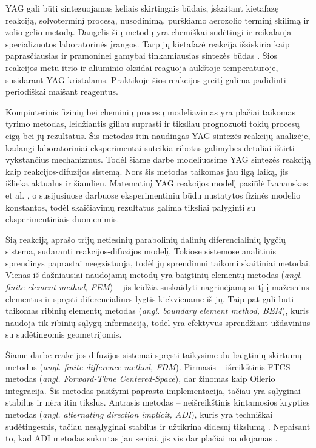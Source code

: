 \documentclass[]{VUMIFTemplateClass}
\begin{document}
YAG gali būti sintezuojamas keliais skirtingais būdais, įskaitant kietafazę reakciją, solvoterminį procesą, nusodinimą, purškiamo aerozolio terminį skilimą ir zolio-gelio metodą. Daugelis šių metodų yra chemiškai sudėtingi ir reikalauja specializuotos laboratorinės įrangos. Tarp jų kietafazė reakcija išsiskiria kaip paprasčiausias ir pramoninei gamybai tinkamiausias sintezės būdas \cite{zhangNovelSynthesisYAG2005}. Šios reakcijos metu itrio ir aliuminio oksidai reaguoja aukštoje temperatūroje, susidarant YAG kristalams. Praktikoje šios reakcijos greitį galima padidinti periodiškai maišant reagentus.

Kompiuterinis fizinių bei cheminių procesų modeliavimas yra plačiai taikomas tyrimo metodas, leidžiantis giliau suprasti ir tiksliau prognozuoti tokių procesų eigą bei jų rezultatus. Šis metodas itin naudingas YAG sintezės reakcijų analizėje, kadangi laboratoriniai eksperimentai suteikia ribotas galimybes detaliai ištirti vykstančius mechanizmus. Todėl šiame darbe modeliuosime YAG sintezės reakciją kaip reakcijos-difuzijos sistemą. Nors šis metodas taikomas jau ilgą laiką, jis išlieka aktualus ir šiandien. Matematinį YAG reakcijos modelį pasiūlė Ivanauskas et al. \cite{ivanauskasModellingSolidState2005}, o susijusiuose darbuose \cite{ivanauskasComputationalModellingYAG2009,mackeviciusCloserLookComputer2012} eksperimentiniu būdu nustatytos fizinės modelio konstantos, todėl skaičiavimų rezultatus galima tiksliai palyginti su eksperimentiniais duomenimis.

Šią reakciją aprašo trijų netiesinių parabolinių dalinių diferencialinių lygčių sistema, sudaranti reakcijos-difuzijos modelį. Tokiose sistemose analitinis sprendinys paprastai neegzistuoja, todėl jų sprendimui taikomi skaitiniai metodai. Vienas iš dažniausiai naudojamų metodų yra baigtinių elementų metodas (\textit{angl. finite element method, FEM}) – jis leidžia suskaidyti nagrinėjamą sritį į mažesnius elementus ir spręsti diferencialines lygtis kiekviename iš jų. Taip pat gali būti taikomas ribinių elementų metodas (\textit{angl. boundary element method, BEM}), kuris naudoja tik ribinių sąlygų informaciją, todėl yra efektyvus sprendžiant uždavinius su sudėtingomis geometrijomis.

Šiame darbe reakcijos-difuzijos sistemai spręsti taikysime du baigtinių skirtumų metodus (\textit{angl. finite difference method, FDM}). Pirmasis – išreikštinis FTCS metodas (\textit{angl. Forward-Time Centered-Space}), dar žinomas kaip Oilerio integracija. Šis metodas pasižymi paprasta implementacija, tačiau yra sąlyginai stabilus ir nėra itin tikslus. Antrasis metodas – neišreikštinis kintamosios krypties metodas (\textit{angl. alternating direction implicit, ADI}), kuris yra techniškai sudėtingesnis, tačiau nesąlyginai stabilus ir užtikrina didesnį tikslumą \cite{NumericalSolutionParabolic}. Nepaisant to, kad ADI metodas sukurtas jau seniai, jis vis dar plačiai naudojamas \cite{gaidamauskaiteComparisonFiniteDifference2007}.
\end{document}

